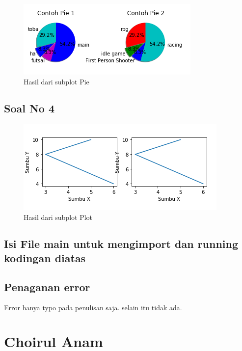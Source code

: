 \begin{figure}[h]
\centering
\includegraphics[scale=1.2]{figures/6/Praktek/1174005/pie.png}
\caption{Hasil dari subplot Pie}
\label{fig:contoh}
\end{figure}

\subsection{Soal No 4}



\begin{figure}[h]
\centering
\includegraphics[scale=0.9]{figures/6/Praktek/1174005/plot.png}
\caption{Hasil dari subplot Plot}
\label{fig:contoh}
\end{figure}

\subsection{Isi File main untuk mengimport dan running kodingan diatas}



\subsection{Penaganan error}
Error hanya typo pada penulisan saja. selain itu tidak ada.

\section{Choirul Anam}
